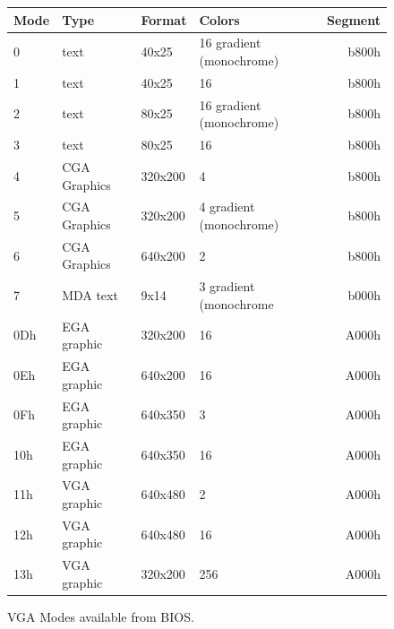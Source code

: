\documentclass[book.tex]{subfiles}
\begin{document}
\begin{figure}[H]
\centering
\begin{table}[H]
\begin{tabular}[c]{llllr}
\hline
\textbf{Mode} & \textbf{Type} & \textbf{Format} & \textbf{Colors}          & \multicolumn{1}{l}{\textbf{Segment}} \\ \hline
0             & text          & 40x25           & 16 gradient (monochrome) & b800h                                \\ \hline
1             & text          & 40x25           & 16                       & b800h                                \\ \hline
2             & text          & 80x25           & 16 gradient (monochrome) & b800h                                \\ \hline
3             & text          & 80x25           & 16                       & b800h                                \\ \hline
4             & CGA Graphics  & 320x200         & 4                        & b800h                                \\ \hline
5             & CGA Graphics  & 320x200         & 4 gradient (monochrome)  & b800h                                \\ \hline
6             & CGA Graphics  & 640x200         & 2                        & b800h                                \\ \hline
7             & MDA text      & 9x14            & 3 gradient (monochrome   & b000h                                \\ \hline
0Dh           & EGA graphic   & 320x200         & 16                       & A000h                                \\ \hline
0Eh           & EGA graphic   & 640x200         & 16                       & A000h                                \\ \hline
0Fh           & EGA graphic   & 640x350         & 3                        & A000h                                \\ \hline
10h           & EGA graphic   & 640x350         & 16                       & A000h                                \\ \hline
11h           & VGA graphic   & 640x480         & 2                        & A000h                                \\ \hline
12h           & VGA graphic   & 640x480         & 16                       & A000h                                \\ \hline
13h           & VGA graphic   & 320x200         & 256                      & A000h                                \\ \hline
\end{tabular}
\end{table}
\caption{VGA Modes available from BIOS.}\label{fig:vga_modes}
 \end{figure}
 
\end{document}

